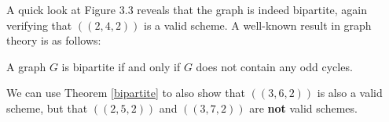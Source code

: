 A quick look at Figure 3.3 reveals that the graph is indeed bipartite, again verifying that $((2,4,2))$ is a valid scheme. A well-known result in graph theory is as follows:

\begin{theorem}
	\label{bipartite}
	A graph $G$ is bipartite if and only if $G$ does not contain any odd cycles.
\end{theorem}

We can use Theorem \ref{bipartite} to also show that $((3,6,2))$ is also a valid scheme, but that $((2,5,2))$ and $((3,7,2))$ are \textbf{not} valid schemes.


